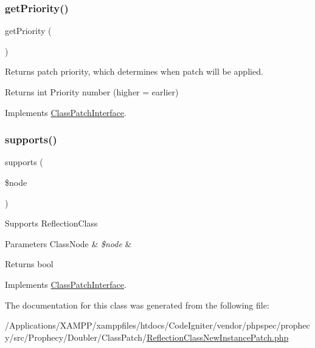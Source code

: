 \subsubsection{\texorpdfstring{get\+Priority()}{getPriority()}}
{\footnotesize\ttfamily get\+Priority (\begin{DoxyParamCaption}{ }\end{DoxyParamCaption})}

Returns patch priority, which determines when patch will be applied.

\begin{DoxyReturn}{Returns}
int Priority number (higher = earlier) 
\end{DoxyReturn}


Implements \mbox{\hyperlink{interface_prophecy_1_1_doubler_1_1_class_patch_1_1_class_patch_interface_a1e7a3c168dcd0901a0d2669c67575b55}{Class\+Patch\+Interface}}.

\mbox{\label{class_prophecy_1_1_doubler_1_1_class_patch_1_1_reflection_class_new_instance_patch_a99b2455ac194faf79aff042c55719ac2}} 
\subsubsection{\texorpdfstring{supports()}{supports()}}
{\footnotesize\ttfamily supports (\begin{DoxyParamCaption}\item[{\mbox{\hyperlink{class_prophecy_1_1_doubler_1_1_generator_1_1_node_1_1_class_node}{Class\+Node}}}]{\$node }\end{DoxyParamCaption})}

Supports Reflection\+Class


\begin{DoxyParams}[1]{Parameters}
Class\+Node & {\em \$node} & \\
\hline
\end{DoxyParams}
\begin{DoxyReturn}{Returns}
bool 
\end{DoxyReturn}


Implements \mbox{\hyperlink{interface_prophecy_1_1_doubler_1_1_class_patch_1_1_class_patch_interface_a99b2455ac194faf79aff042c55719ac2}{Class\+Patch\+Interface}}.



The documentation for this class was generated from the following file\+:\begin{DoxyCompactItemize}
\item 
/\+Applications/\+X\+A\+M\+P\+P/xamppfiles/htdocs/\+Code\+Igniter/vendor/phpspec/prophecy/src/\+Prophecy/\+Doubler/\+Class\+Patch/\mbox{\hyperlink{_reflection_class_new_instance_patch_8php}{Reflection\+Class\+New\+Instance\+Patch.\+php}}\end{DoxyCompactItemize}
